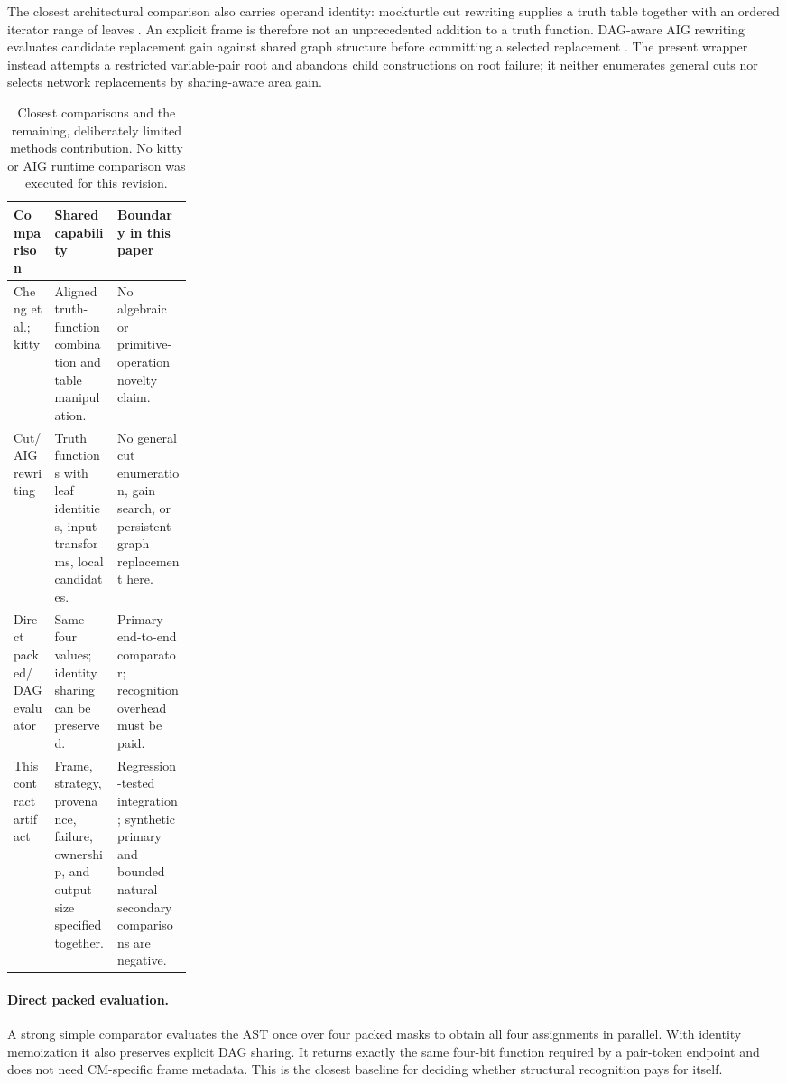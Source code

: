 \documentclass[10pt]{article}
\theoremstyle{plain}
\theoremstyle{definition}
\theoremstyle{remark}
\begin{document}
The closest architectural comparison also carries operand identity: mockturtle cut rewriting supplies a truth table together with an ordered iterator range of leaves \cite{MockturtleCut}. An explicit frame is therefore not an unprecedented addition to a truth function. DAG-aware AIG rewriting evaluates candidate replacement gain against shared graph structure before committing a selected replacement \cite{Mishchenko2006}. The present wrapper instead attempts a restricted variable-pair root and abandons child constructions on root failure; it neither enumerates general cuts nor selects network replacements by sharing-aware area gain.

\begin{table}[H]
\small\centering
\begin{tabularx}{\linewidth}{@{}p{0.23\linewidth}XX@{}}
\toprule
\textbf{Comparison} & \textbf{Shared capability} & \textbf{Boundary in this paper}\\
\midrule
Cheng et al.; kitty & Aligned truth-function combination and table manipulation. & No algebraic or primitive-operation novelty claim.\\
Cut/AIG rewriting & Truth functions with leaf identities, input transforms, local candidates. & No general cut enumeration, gain search, or persistent graph replacement here.\\
Direct packed/DAG evaluator & Same four values; identity sharing can be preserved. & Primary end-to-end comparator; recognition overhead must be paid.\\
This contract artifact & Frame, strategy, provenance, failure, ownership, and output size specified together. & Regression-tested integration; synthetic primary and bounded natural secondary comparisons are negative.\\
\bottomrule
\end{tabularx}
\caption{Closest comparisons and the remaining, deliberately limited methods contribution. No kitty or AIG runtime comparison was executed for this revision.}
\end{table}

\paragraph{Direct packed evaluation.}
A strong simple comparator evaluates the AST once over four packed masks to obtain all four assignments in parallel. With identity memoization it also preserves explicit DAG sharing. It returns exactly the same four-bit function required by a pair-token endpoint and does not need CM-specific frame metadata. This is the closest baseline for deciding whether structural recognition pays for itself.
\end{document}
